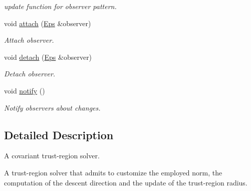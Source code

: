 \begin{DoxyCompactItemize}
\begin{DoxyCompactList}\small\item\em update function for observer pattern. \end{DoxyCompactList}\item 
\hypertarget{classSpacy_1_1Mixin_1_1MixinConnection_abb5520ee6b22dd993d78f142939a1ed4}{void \hyperlink{classSpacy_1_1Mixin_1_1MixinConnection_abb5520ee6b22dd993d78f142939a1ed4}{attach} (\hyperlink{classSpacy_1_1Mixin_1_1Eps_af616ae8e55a645cefd4d2d4504d6705a}{\-Eps} \&observer)}\label{classSpacy_1_1Mixin_1_1MixinConnection_abb5520ee6b22dd993d78f142939a1ed4}

\begin{DoxyCompactList}\small\item\em \-Attach observer. \end{DoxyCompactList}\item 
\hypertarget{classSpacy_1_1Mixin_1_1MixinConnection_adda739590c487679c26f60e50aedb73f}{void \hyperlink{classSpacy_1_1Mixin_1_1MixinConnection_adda739590c487679c26f60e50aedb73f}{detach} (\hyperlink{classSpacy_1_1Mixin_1_1Eps_af616ae8e55a645cefd4d2d4504d6705a}{\-Eps} \&observer)}\label{classSpacy_1_1Mixin_1_1MixinConnection_adda739590c487679c26f60e50aedb73f}

\begin{DoxyCompactList}\small\item\em \-Detach observer. \end{DoxyCompactList}\item 
\hypertarget{classSpacy_1_1Mixin_1_1MixinConnection_a1ddeaa78a3bb4a38c2cca36d1f99fe36}{void \hyperlink{classSpacy_1_1Mixin_1_1MixinConnection_a1ddeaa78a3bb4a38c2cca36d1f99fe36}{notify} ()}\label{classSpacy_1_1Mixin_1_1MixinConnection_a1ddeaa78a3bb4a38c2cca36d1f99fe36}

\begin{DoxyCompactList}\small\item\em \-Notify observers about changes. \end{DoxyCompactList}\end{DoxyCompactItemize}


\subsection{\-Detailed \-Description}
\-A covariant trust-\/region solver. 

\-A trust-\/region solver that admits to customize the employed norm, the computation of the descent direction and the update of the trust-\/region radius. 

